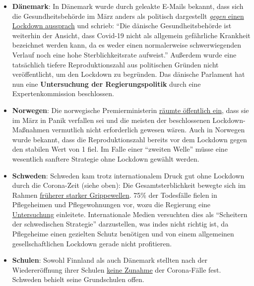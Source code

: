 \begin{itemize}
\tightlist
\item
  \textbf{Dänemark}: In Dänemark wurde durch geleakte E-Mails bekannt,
  dass sich die Gesundheitsbehörde im März anders als politisch
  dargestellt
  \href{https://www.thelocal.dk/20200529/leaked-emails-show-how-denmarks-pm-steam-rollered-her-own-health-agency}{\emph{gegen}
  einen Lockdown aussprach} und schrieb: ``Die dänische
  Gesundheitsbehörde ist weiterhin der Ansicht, dass Covid-19 nicht als
  allgemein gefährliche Krankheit bezeichnet werden kann, da es weder
  einen normalerweise schwerwiegenden Verlauf noch eine hohe
  Sterblichkeitsrate aufweist.'' Außerdem wurde eine tatsächlich tiefere
  Reproduktionszahl aus politischen Gründen nicht veröffentlicht, um den
  Lockdown zu begründen. Das dänische Parlament hat nun eine
  \textbf{Untersuchung der Regierungspolitik} durch eine
  Expertenkommission beschlossen.\\
\item
  \textbf{Norwegen}: Die norwegische Premierministerin
  \href{https://www.telegraph.co.uk/news/2020/05/30/coronavirus-norway-wonders-should-have-like-sweden/}{räumte
  öffentlich ein}, dass sie im März in Panik verfallen sei und die
  meisten der beschlossenen Lockdown-Maßnahmen vermutlich nicht
  erforderlich gewesen wären. Auch in Norwegen wurde bekannt, dass die
  Reproduktionszahl bereits vor dem Lockdown gegen den stabilen Wert von
  1 fiel. Im Falle einer ``zweiten Welle'' müsse eine wesentlich
  sanftere Strategie ohne Lockdown gewählt werden.
\item
  \textbf{Schweden}: Schweden kam trotz internationalem Druck gut ohne
  Lockdown durch die Corona-Zeit (siehe oben): Die Gesamtsterblichkeit
  bewegte sich im Rahmen
  \href{https://www.reuters.com/article/us-health-coronavirus-sweden-toll/coronavirus-pushes-swedish-deaths-to-highest-since-1993-in-april-idUSKBN22U1S4}{früherer
  starker Grippewellen}. 75\% der Todesfälle fielen in Pflegeheimen und
  Pflegewohnungen vor, wozu die Regierung eine
  \href{https://www.bloomberg.com/news/articles/2020-05-08/sweden-starts-criminal-probe-into-care-home-after-virus-deaths}{Untersuchung}
  einleitete. Internationale Medien versuchten dies als ``Scheitern der
  schwedischen Strategie'' darzustellen, was indes nicht richtig ist, da
  Pflegeheime einen gezielten Schutz benötigen und von einem allgemeinen
  gesellschaftlichen Lockdown gerade nicht profitieren.
\item
  \textbf{Schulen}: Sowohl Finnland als auch Dänemark stellten nach der
  Wiedereröffnung ihrer Schulen
  \href{https://www.telegraph.co.uk/news/2020/06/04/no-rise-finlands-coronavirus-infection-rate-since-schools-reopened/}{keine
  Zunahme} der Corona-Fälle fest. Schweden behielt seine Grundschulen
  offen.
\end{itemize}

